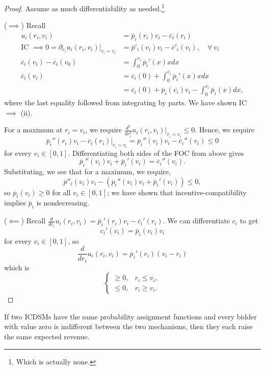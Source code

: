 \begin{proof}
	Assume as much differentiability as needed.\footnote{Which is actually none.}

	($\implies$) Recall
	\begin{align*}
		u_i(r_i,v_i) &= \overline{p}_i(r_i)v_i - \overline{c}_i(r_i) \\
		\text{IC } \implies 0 = \partial_{r_i} u_i(r_i,v_i)\left.\right|_{r_i = v_i} &= \overline{p}'_i(v_i)v_i - \overline{c}'_i(v_i), \quad \forall\ v_i \\
			\overline{c}_i(v_i) - \overline{c}_i(v_0) &= \int_{0}^{v_i} \overline{p}_i'(x)xdx \\ 
			\overline{c}_i(v_i) &= \overline{c}_i(0) + \int_{0}^{v_i} \overline{p}_i'(x)xdx 	 \\
								&= \overline{c}_i(0) + \overline{p}_i(v_i)v_i - \int_{0}^{v_i} \overline{p}_i(x)dx 
	,\end{align*}
	where the last equality followed from integrating by parts. We have shown IC $\implies$ (ii).
	
	For a maximum at $r_i = v_i$, we require $\frac{d^2}{dr_i^2} u_i(r_i,v_i)\left.\right|_{r_i = v_i} \le 0$. Hence, we require \[
		\overline{p}_i''(r_i)v_i - \overline{c}_i(r_i) \left.\right|_{r_i = v_i} = \overline{p}_i''(v_i) v_i - \overline{c}_i ''(v_i) \le 0
		\] for every $v_i \in [0,1]$.
		Differentiating both sides of the FOC from above gives \[
			\overline{p}_i ''(v_i) v_i + \overline{p}_i'(v_i) = \overline{c}_i''(v_i)
		.\] Substituting, we see that for a maximum, we require, \[
			\overline{p}''_i(v_i)v_i - \left( \overline{p}_i''(v_i)v_i + \overline{p}_i'(v_i) \right) \le 0
		,\] so $\overline{p}_i(v_i) \ge 0$ for all $v_i \in [0,1]$; we have shown that incentive-compatibility implies $\overline{p}_i$ is nondecreasing.

		($\impliedby$) Recall $\frac{d}{dr_i} u_i(r_i,v_i) = \overline{p}_i'(r_i)v_i - \overline{c}_i'(r_i)$. We can differentiate $c_i$ to get \[
			c_i'(v_i) = \overline{p}_i(v_i)v_i
		\] for every $v_i \in [0,1]$, so
		\[
			\frac{d}{dr_i} u_i(r_i,v_i) = \overline{p}_i'(r_i) (v_i - r_i)
		\]
		which is
		\[
			\begin{cases}
				\ge 0, & r_i \le v_i, \\
				\le 0, & r_i \ge v_i.
			\end{cases}
		\]
	\end{proof}

\begin{theorem}
	If two ICDSMs have the same probability assignment functions and every bidder with value zero is indifferent between the two mechanisms, then they each raise the same expected revenue.
\end{theorem}

